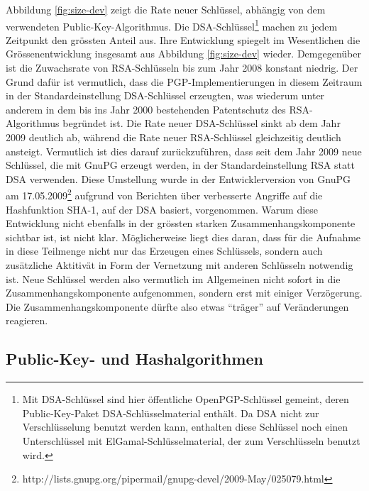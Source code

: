 Abbildung \ref{fig:size-dev} zeigt die Rate neuer Schl\"ussel,
abh\"angig von dem verwendeten Public-Key-Algorithmus. Die
DSA-Schl\"ussel\footnote{Mit DSA-Schl\"ussel sind hier \"offentliche
  OpenPGP-Schl\"ussel gemeint, deren Public-Key-Paket
  DSA-Schl\"usselmaterial enth\"alt. Da DSA nicht zur
  Verschl\"usselung benutzt werden kann, enthalten diese Schl\"ussel
  noch einen Unterschl\"ussel mit ElGamal-Schl\"usselmaterial, der zum
  Verschl\"usseln benutzt wird.} machen zu jedem Zeitpunkt den
gr\"ossten Anteil aus. Ihre Entwicklung spiegelt im Wesentlichen die
Gr\"ossenentwicklung insgesamt aus Abbildung \ref{fig:size-dev}
wieder. Demgegen\"uber ist die Zuwachsrate von RSA-Schl\"usseln bis
zum Jahr 2008 konstant niedrig. Der Grund daf\"ur ist vermutlich, dass
die PGP-Implementierungen in diesem Zeitraum in der
Standardeinstellung DSA-Schl\"ussel erzeugten, was wiederum unter
anderem in dem bis ins Jahr 2000 bestehenden Patentschutz des
RSA-Algorithmus begr\"undet ist.  Die Rate neuer DSA-Schl\"ussel sinkt
ab dem Jahr 2009 deutlich ab, w\"ahrend die Rate neuer RSA-Schl\"ussel
gleichzeitig deutlich ansteigt. Vermutlich ist dies darauf
zur\"uckzuf\"uhren, dass seit dem Jahr 2009 neue Schl\"ussel, die mit
GnuPG erzeugt werden, in der Standardeinstellung RSA statt DSA
verwenden. Diese Umstellung wurde in der Entwicklerversion von GnuPG
am
17.05.2009\footnote{http://lists.gnupg.org/pipermail/gnupg-devel/2009-May/025079.html}
aufgrund von Berichten \"uber verbesserte Angriffe auf die
Hashfunktion SHA-1\cite{McDonald2009}, auf der DSA basiert,
vorgenommen. Warum diese Entwicklung nicht ebenfalls in der gr\"ossten
starken Zusammenhangskomponente sichtbar ist, ist nicht
klar. M\"oglicherweise liegt dies daran, dass f\"ur die Aufnahme in
diese Teilmenge nicht nur das Erzeugen eines Schl\"ussels, sondern
auch zus\"atzliche Aktitiv\"at in Form der Vernetzung mit anderen
Schl\"usseln notwendig ist. Neue Schl\"ussel werden also vermutlich im
Allgemeinen nicht sofort in die Zusammenhangskomponente aufgenommen,
sondern erst mit einiger Verz\"ogerung. Die Zusammenhangskomponente
d\"urfte also etwas ``tr\"ager'' auf Ver\"anderungen reagieren.

\subsection{Public-Key- und Hashalgorithmen}
\label{sec:public-key-und}

